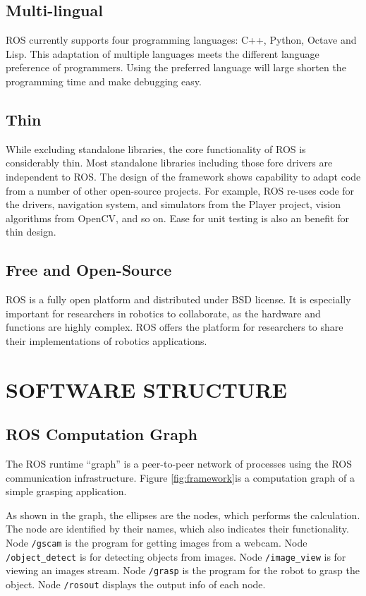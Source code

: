 \documentclass[a4paper, 10pt, conference]{ieeeconf}       %
\begin{document}
\subsection{Multi-lingual}

ROS currently supports four programming languages: C++, Python, Octave and Lisp. This adaptation of multiple languages meets the different language preference of programmers. Using the preferred language will large shorten the programming time and make debugging easy.

\subsection{Thin}

While excluding standalone libraries, the core functionality of ROS is considerably thin. Most standalone libraries including those fore drivers are independent to ROS. The design of the framework shows capability to adapt code from a number of other open-source projects. For example, ROS re-uses code for the drivers, navigation system, and simulators from the Player project, vision algorithms from OpenCV, and so on. Ease for unit testing is also an benefit for thin design.

\subsection{Free and Open-Source}

ROS is a fully open platform and distributed under BSD license. It is especially important for researchers in robotics to collaborate, as the hardware and functions are highly complex. ROS offers the platform for researchers to share their implementations of robotics applications.

\section{SOFTWARE STRUCTURE}

\subsection{ROS Computation Graph}
The ROS runtime ``graph'' is a peer-to-peer network of processes using the ROS communication infrastructure. Figure \ref{fig:framework}is a computation graph of a simple grasping application.

As shown in the graph, the ellipses are the nodes, which performs the calculation. The node are identified by their names, which also indicates their functionality. Node \texttt{/gscam} is the program for getting images from a webcam. Node \texttt{/object\_detect} is for detecting objects from images. Node \texttt{/image\_view} is for viewing an images stream. Node \texttt{/grasp} is the program for the robot to grasp the object. Node \texttt{/rosout} displays the output info of each node.
\end{document}
